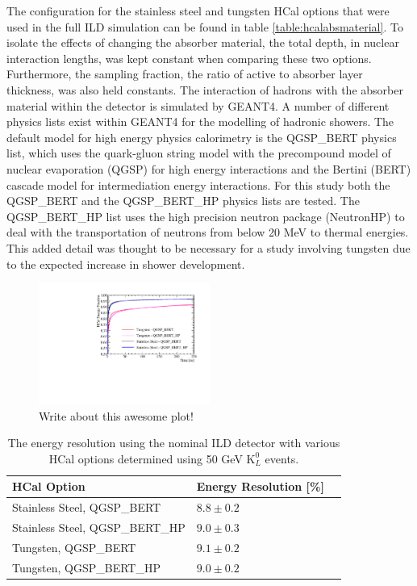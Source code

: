 The configuration for the stainless steel and tungsten HCal options that were used in the full ILD simulation can be found in table \ref{table:hcalabsmaterial}.  To isolate the effects of changing the absorber material, the total depth, in nuclear interaction lengths, was kept constant when comparing these two options.  Furthermore, the sampling fraction, the ratio of active to absorber layer thickness, was also held constants.  The interaction of hadrons with the absorber material within the detector is simulated by GEANT4.  A number of different physics lists exist within GEANT4 for the modelling of hadronic showers.  The default model for high energy physics calorimetry is the QGSP\_BERT physics list, which uses the quark-gluon string model \cite{Folger:2003sb} with the precompound model of nuclear evaporation \cite{geantStringModel} (QGSP) for high energy interactions and the Bertini (BERT) cascade model \cite{Guthrie:1968ue} for intermediation energy interactions.  For this study both the QGSP\_BERT and the QGSP\_BERT\_HP physics lists are tested.  The QGSP\_BERT\_HP list uses the high precision neutron package (NeutronHP) to deal with the transportation of neutrons from below 20 MeV to thermal energies.  This added detail was thought to be necessary for a study involving tungsten due to the expected increase in shower development.    


\begin{figure}
\centering
\includegraphics[width=0.5\textwidth]{OptimisationStudies/Plots/Description/HCalAbsorberMaterialTimings.pdf}
\caption[]{Write about this awesome plot!}
\label{fig:hcalabsmaterialtiming}
\end{figure} 


\begin{table}[h!]
\centering
\begin{tabular}{ l l l }
\hline
HCal Option & Energy Resolution [\%] \\
\hline
Stainless Steel, QGSP\_BERT & $8.8\pm0.2$ \\
Stainless Steel, QGSP\_BERT\_HP & $9.0\pm0.3$ \\
Tungsten, QGSP\_BERT & $9.1\pm0.2$ \\
Tungsten, QGSP\_BERT\_HP & $9.0\pm0.2$ \\
\hline
\end{tabular}
\caption[The energy resolution using the nominal ILD detector with various HCal options determined using 50 GeV $\text{K}^{0}_{L}$ events.]{The energy resolution using the nominal ILD detector with various HCal options determined using 50 GeV $\text{K}^{0}_{L}$ events.}
\label{table:erhcalabsmaterial}
\end{table}

